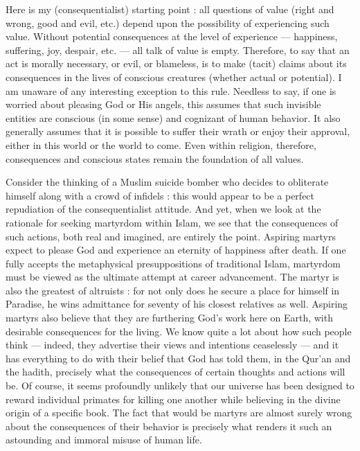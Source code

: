 \documentclass[a4paper,14pt]{extbook}
\begin{document}
Here is my (consequentialist) starting point :
all questions of value (right and wrong, good and evil, etc.) depend upon the possibility of experiencing such value.
Without potential consequences at the level of experience --- happiness, suffering, joy, despair, etc. --- all talk of value is empty.
Therefore, to say that an act is morally necessary, or evil, or blameless, is to make (tacit) claims about its consequences in the lives of conscious creatures (whether actual or potential).
I am unaware of any interesting exception to this rule.
Needless to say, if one is worried about pleasing God or His angels, this assumes that such invisible entities are conscious (in some sense) and cognizant of human behavior.
It also generally assumes that it is possible to suffer their wrath or enjoy their approval, either in this world or the world to come.
Even within religion, therefore, consequences and conscious states remain the foundation of all values.

Consider the thinking of a Muslim suicide bomber who decides to obliterate himself along with a crowd of infidels :
this would appear to be a perfect repudiation of the consequentialist attitude.
And yet, when we look at the rationale for seeking martyrdom within Islam, we see that the consequences of such actions, both real and imagined, are entirely the point.
Aspiring martyrs expect to please God and experience an eternity of happiness after death.
If one fully accepts the metaphysical presuppositions of traditional Islam, martyrdom must be viewed as the ultimate attempt at career advancement.
The martyr is also the greatest of altruists :
for not only does he secure a place for himself in Paradise, he wins admittance for seventy of his closest relatives as well.
Aspiring martyrs also believe that they are furthering God's work here on Earth, with desirable consequences for the living.
We know quite a lot about how such people think --- indeed, they advertise their views and intentions ceaselessly --- and it has everything to do with their belief that God has told them, in the Qur'an and the hadith, precisely what the consequences of certain thoughts and actions will be.
Of course, it seems profoundly unlikely that our universe has been designed to reward individual primates for killing one another while believing in the divine origin of a specific book.
The fact that would be martyrs are almost surely wrong about the consequences of their behavior is precisely what renders it such an astounding and immoral misuse of human life.
\end{document}
